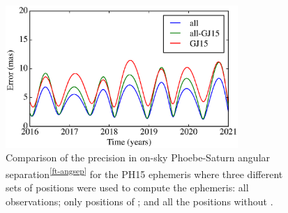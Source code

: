 \documentclass[useAMS,usenatbib]{mn2e}
\begin{document}
\begin{figure}
\begin{centering}
\includegraphics[width=8.8cm]{figures/PH15_err_angsep.eps}  
\caption{Comparison of the precision in on-sky Phoebe-Saturn angular separation\textsuperscript{\ref{ft-angsep}} for the PH15 ephemeris where three different sets of positions were used to compute the ephemeris: all observations; only positions of ; and all the positions without .}
\label{Fig:err-Phoebe}
\end{centering}
\end{figure}
\end{document}
